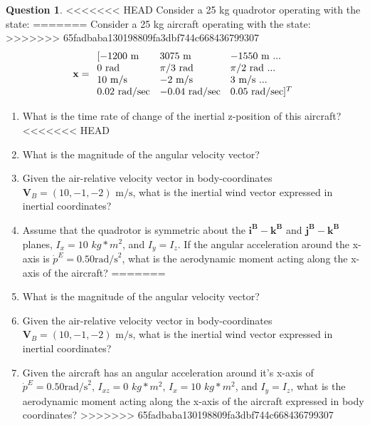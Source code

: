 \documentclass{article}
\theoremstyle{definition}
\newtheorem{question}{Question}
\begin{document}
\begin{question}

<<<<<<< HEAD
Consider a 25 kg quadrotor operating with the state:
=======
Consider a 25 kg aircraft operating with the state:
>>>>>>> 65fadbaba130198809fa3dbf744c668436799307
\begin{equation}
\nonumber
{\bf x} = 
\begin{array}{lll}
[-1200 \textrm{ m} & 3075 \textrm{ m} & -1550 \textrm{ m } ... \\
0 \textrm{ rad} & \pi/3 \textrm{ rad} & \pi/2 \textrm{ rad } ... \\
10 \textrm{ m/s} & -2 \textrm{ m/s} & 3 \textrm{ m/s } ... \\
0.02 \textrm{ rad/sec} & -0.04 \textrm{ rad/sec} & 0.05 \textrm{ rad/sec}]^T
\end{array}
\end{equation}

\begin{enumerate}[label=(\Alph*)]

\item What is the time rate of change of the inertial z-position of this aircraft?
<<<<<<< HEAD
\item What is the magnitude of the angular velocity vector?

\item Given the air-relative velocity vector in body-coordinates $\mathbf{V}_B = (10, -1, -2) \textrm{ m/s}$, what is the inertial wind vector expressed in inertial coordinates?

\item Assume that the quadrotor is symmetric about the $\mathbf{i^B-k^B}$ and $\mathbf{j^B-k^B}$ planes, $I_x = 10$ $kg* m^2$, and $I_y = I_z$. If the angular acceleration around the x-axis is $\dot{p}^E = 0.50 \textrm{rad/s}^2$, what is the aerodynamic moment acting along the x-axis of the aircraft? 
=======
\item What is the magnitude of the angular velocity vector?
\item Given the air-relative velocity vector in body-coordinates $\mathbf{V}_B = (10, -1, -2) \textrm{ m/s}$, what is the inertial wind vector expressed in inertial coordinates?

\item Given the aircraft has an angular acceleration around it's x-axis of $\dot{p}^E = 0.50 \textrm{rad/s}^2$, $I_{xz} = 0$ $kg*m^2$, $I_x = 10$ $kg* m^2$, and $I_y = I_z$, what is the aerodynamic moment acting along the x-axis of the aircraft expressed in body coordinates? 
>>>>>>> 65fadbaba130198809fa3dbf744c668436799307

\end{enumerate}

\end{question}
\end{document}
